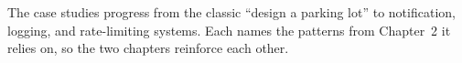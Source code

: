 The case studies progress from the classic ``design a parking lot'' to
notification, logging, and rate-limiting systems. Each names the patterns
from Chapter~2 it relies on, so the two chapters reinforce each other.

\newpage









